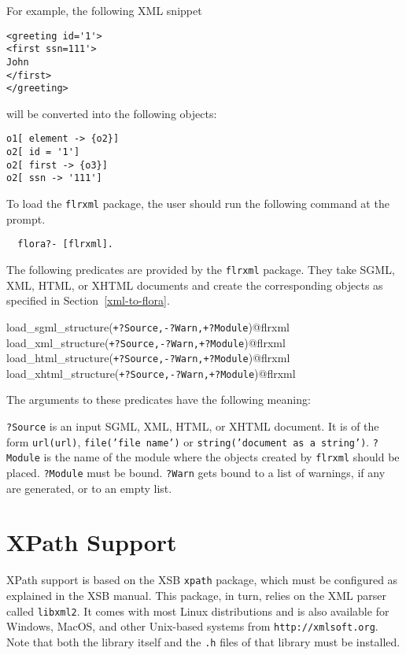 For example, the following XML snippet

\begin{verbatim}
<greeting id='1'>
<first ssn=111'>
John
</first>
</greeting>
\end{verbatim}

will be converted into the following \FLORA objects:

\begin{verbatim}
o1[ element -> {o2}]
o2[ id = '1']
o2[ first -> {o3}]
o2[ ssn -> '111']
\end{verbatim}

To load the {\tt flrxml} package, the user should run the
following command at the \FLORA prompt.

\begin{verbatim}
  flora?- [flrxml]. 
\end{verbatim}

The following predicates are provided by the {\tt flrxml} package.  They
take SGML, XML, HTML, or XHTML documents and create the corresponding
\FLORA objects as specified in Section~\ref{xml-to-flora}.

\begin{description}
\item [load\_sgml\_structure({\tt +?Source,-?Warn,+?Module})@flrxml]
\item[load\_xml\_structure({\tt +?Source,-?Warn,+?Module})@flrxml]
\item[load\_html\_structure({\tt +?Source,-?Warn,+?Module})@flrxml]
\item[load\_xhtml\_structure({\tt +?Source,-?Warn,+?Module})@flrxml]
\end{description}
The arguments to these predicates have the following meaning:

{\tt ?Source} is an input SGML, XML, HTML, or XHTML document.
It is of the form {\tt url({\tt {url}})},
{\tt file('{\tt {file name}}')} or {\tt string('{\tt document as a string}')}. 
{\tt ?Module} is the name of the \FLORA module where the objects created
by {\tt flrxml}  should be placed. {\tt ?Module}  must be bound.
{\tt ?Warn} gets bound to a list of warnings, if any are generated, or to
an empty list.
  

\section{XPath Support}

XPath support is based on the XSB {\tt xpath} package, which must be
configured as explained in the XSB manual. This package, in turn, relies on
the XML parser called {\tt libxml2}. It comes with most Linux
distributions and is also available for Windows, MacOS, and other
Unix-based systems from {\tt http://xmlsoft.org}. 
Note that both the library itself and the {\tt .h} files of that
library must be installed. 

